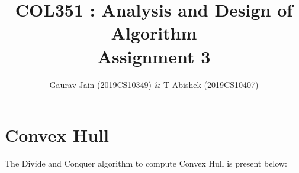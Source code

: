\documentclass[a4paper]{article}
\begin{document}

\title{\textbf{COL351 : Analysis and Design of Algorithm \\ Assignment 3 }}
\author{Gaurav Jain (2019CS10349) \& T Abishek (2019CS10407)}
\date{}


\maketitle

\section{Convex Hull}
The Divide and Conquer algorithm to compute Convex Hull is present below:
\end{document}

